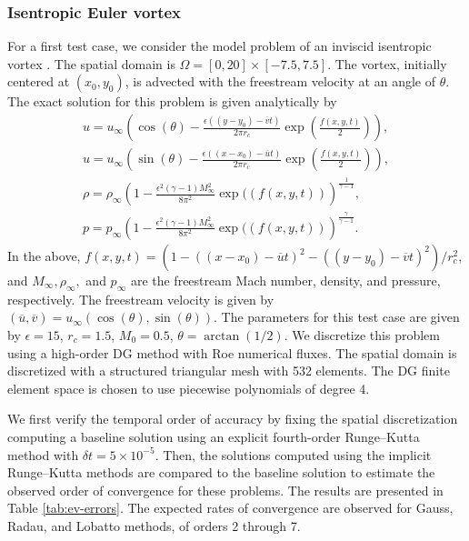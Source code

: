 \documentclass[review]{siamart}
\begin{document}
\subsubsection{Isentropic Euler vortex}
For a first test case, we consider the model problem of an inviscid isentropic vortex \cite{Shu1998,Wang2013}.
The spatial domain is $\Omega = [0,20] \times [-7.5,7.5]$.
The vortex, initially centered at $(x_0, y_0)$, is advected with the freestream velocity at an angle of $\theta$.
The exact solution for this problem is given analytically by
\begin{gather}
\label{eq:ev-exact-1}
   u = u_\infty \left( \cos(\theta) - \frac{\epsilon ((y-y_0)
       - \overline{v} t)}{2\pi r_c}
       \exp\left( \frac{f(x,y,t)}{2} \right) \right),\\
\label{eq:ev-exact-2}
   u = u_\infty \left( \sin(\theta) - \frac{\epsilon ((x-x_0)
       - \overline{u} t)}{2\pi r_c}
       \exp\left( \frac{f(x,y,t)}{2} \right) \right),\\
\label{eq:ev-exact-3}
   \rho = \rho_\infty \left( 1 -
       \frac{\epsilon^2 (\gamma - 1)M^2_\infty}{8\pi^2} \exp((f(x,y,t))
       \right)^{\frac{1}{\gamma-1}}, \\
\label{eq:ev-exact-4}
   p = p_\infty \left( 1 -
       \frac{\epsilon^2 (\gamma - 1)M^2_\infty}{8\pi^2} \exp((f(x,y,t))
       \right)^{\frac{\gamma}{\gamma-1}}.
\end{gather}
In the above, $f(x,y,t) = (1 - ((x-x_0) - \overline{u}t)^2 - ((y-y_0) - \overline{v}t)^2)/r_c^2$, and $M_\infty, \rho_\infty,$ and $p_\infty$ are the freestream Mach number, density, and pressure, respectively.
The freestream velocity is given by $(\overline{u},\overline{v}) = u_\infty (\cos(\theta), \sin(\theta))$.
The parameters for this test case are given by $\epsilon = 15$, $r_c = 1.5$, $M_0 = 0.5$, $\theta = \arctan(1/2)$.
We discretize this problem using a high-order DG method with Roe numerical fluxes.
The spatial domain is discretized with a structured triangular mesh with 532 elements.
The DG finite element space is chosen to use piecewise polynomials of degree 4.

We first verify the temporal order of accuracy by fixing the spatial discretization  computing a baseline solution using an explicit fourth-order Runge--Kutta method with $\delta t = 5\times 10^{-5}$.
Then, the solutions computed using the implicit Runge--Kutta methods are compared to the baseline solution to estimate the observed order of convergence for these problems.
The results are presented in Table \ref{tab:ev-errors}.
The expected rates of convergence are observed for Gauss, Radau, and Lobatto methods, of orders 2 through 7.
\end{document}
